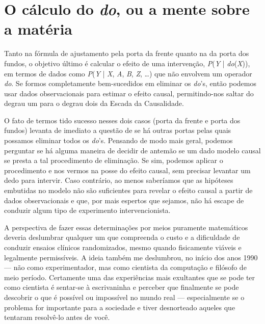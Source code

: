 \documentclass[11pt,a5paper,twoside]{book}
\begin{document}
\section{O cálculo do \textit{do}, ou a mente sobre a matéria}
Tanto na fórmula de ajustamento pela porta da frente quanto na da porta dos fundos, o objetivo último é calcular o efeito de uma intervenção, \textit{P}(\textit{Y} | \textit{do}(\textit{X})), em termos de dados como \textit{P}(\textit{Y} | \textit{X}, \textit{A}, \textit{B}, \textit{Z}, …) que não envolvem um operador \textit{do}. Se formos completamente bem-sucedidos em eliminar os \textit{do}’s, então podemos usar dados observacionais para estimar o efeito causal, permitindo-nos saltar do degrau um para o degrau dois da Escada da Causalidade.

O fato de termos tido sucesso nesses dois casos (porta da frente e porta dos fundos) levanta de imediato a questão de se há outras portas pelas quais possamos eliminar todos os \textit{do}’s. Pensando de modo mais geral, podemos perguntar se há alguma maneira de decidir de antemão se um dado modelo causal se presta a tal procedimento de eliminação. Se sim, podemos aplicar o procedimento e nos vermos na posse do efeito causal, sem precisar levantar um dedo para intervir. Caso contrário, ao menos saberíamos que as hipóteses embutidas no modelo não são suficientes para revelar o efeito causal a partir de dados observacionais e que, por mais espertos que sejamos, não há escape de conduzir algum tipo de experimento intervencionista.

A perspectiva de fazer essas determinações por meios puramente matemáticos deveria deslumbrar qualquer um que compreenda o custo e a dificuldade de conduzir ensaios clínicos randomizados, mesmo quando fisicamente viáveis e legalmente permissíveis. A ideia também me deslumbrou, no início dos anos 1990 — não como experimentador, mas como cientista da computação e filósofo de meio período. Certamente uma das experiências mais exultantes que se pode ter como cientista é sentar-se à escrivaninha e perceber que finalmente se pode descobrir o que é possível ou impossível no mundo real — especialmente se o problema for importante para a sociedade e tiver desnorteado aqueles que tentaram resolvê-lo antes de você.
\end{document}
